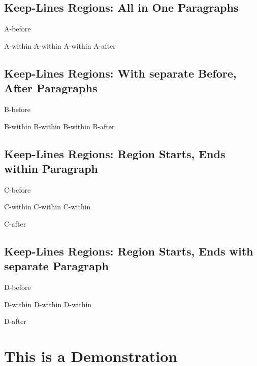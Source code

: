 \section{Keep-Lines Regions: All in One Paragraphs
}
\begin{multicols}{2}\end{multicols}A-before
\mktsShowpar\par
\begingroup\obeyalllines{}A-within
A-within
A-within
\endgroup{}A-after
\begin{multicols}{2}\end{multicols}
\section{Keep-Lines Regions: With separate Before, After Paragraphs
}
\begin{multicols}{2}\end{multicols}B-before\mktsShowpar\par
\begingroup\obeyalllines{}B-within
B-within
B-within
\endgroup{}B-after\mktsShowpar\par
\begin{multicols}{2}\end{multicols}
\section{Keep-Lines Regions: Region Starts, Ends within Paragraph
}
\begin{multicols}{2}\end{multicols}C-before
\mktsShowpar\par
\begingroup\obeyalllines{}C-within
C-within
C-within

\endgroup{}C-after
\begin{multicols}{2}\end{multicols}
\section{Keep-Lines Regions: Region Starts, Ends with separate Paragraph
}
\begin{multicols}{2}\end{multicols}D-before\mktsShowpar\par
\begingroup\obeyalllines{}D-within
D-within
D-within

\endgroup{}D-after
\begin{multicols}{2}\end{multicols}
\chapter{This is a Demonstration 
}
\begin{multicols}{2}\end{multicols}
